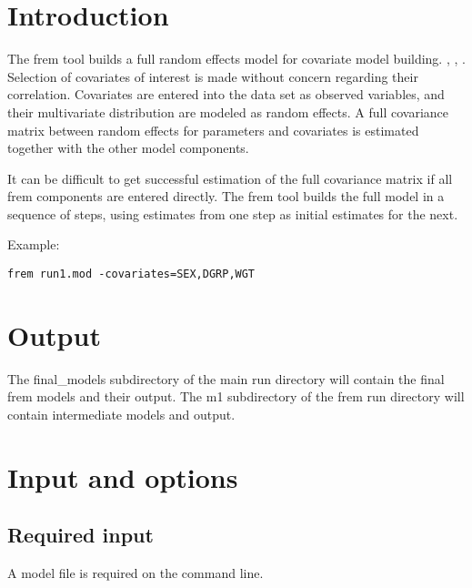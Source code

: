 
\usepackage{amsmath}
\usepackage{hyperref}

\newcommand{\guidetoolname}{frem}

\maketitle
\tableofcontents
\newpage

\section{Introduction}
The frem tool builds a full random effects model for covariate model building. \cite{Karlsson}, \cite{Ivaturi}, \cite{Yun}.
Selection of covariates of interest is made without concern regarding their correlation.
Covariates are entered into the data set as observed variables, and their multivariate distribution are modeled
as random effects. A full covariance matrix between random effects for parameters and covariates is estimated
together with the other model components.

It can be difficult to get successful estimation of the full covariance matrix if all frem components are entered directly.
The frem tool builds the full model in a sequence of steps, using estimates from one step as initial estimates for the next.

Example:
\begin{verbatim}
frem run1.mod -covariates=SEX,DGRP,WGT
\end{verbatim}

\section{Output}
The final\_models subdirectory of the main run directory will contain the final frem models and their output.
The m1 subdirectory of the frem run directory will contain intermediate models and output.

\section{Input and options}
\subsection{Required input}
A model file is required on the command line.

